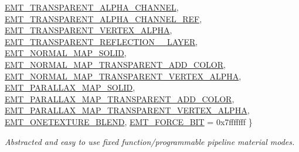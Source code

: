 \begin{DoxyCompactItemize}
\hyperlink{namespaceirr_1_1video_ac8e9b6c66f7cebabd1a6d30cbc5430f1a9b136a4137789140813682f306847ecd}{E\+M\+T\+\_\+\+T\+R\+A\+N\+S\+P\+A\+R\+E\+N\+T\+\_\+\+A\+L\+P\+H\+A\+\_\+\+C\+H\+A\+N\+N\+EL}, 
\hyperlink{namespaceirr_1_1video_ac8e9b6c66f7cebabd1a6d30cbc5430f1a2cbc6ccd7b5a5438e69327663e57555f}{E\+M\+T\+\_\+\+T\+R\+A\+N\+S\+P\+A\+R\+E\+N\+T\+\_\+\+A\+L\+P\+H\+A\+\_\+\+C\+H\+A\+N\+N\+E\+L\+\_\+\+R\+EF}, 
\newline
\hyperlink{namespaceirr_1_1video_ac8e9b6c66f7cebabd1a6d30cbc5430f1aa5139511eb2dbc1d2ae3dd91fc13f842}{E\+M\+T\+\_\+\+T\+R\+A\+N\+S\+P\+A\+R\+E\+N\+T\+\_\+\+V\+E\+R\+T\+E\+X\+\_\+\+A\+L\+P\+HA}, 
\hyperlink{namespaceirr_1_1video_ac8e9b6c66f7cebabd1a6d30cbc5430f1a7d0845dfc024777ddd5f4d8120e7e57a}{E\+M\+T\+\_\+\+T\+R\+A\+N\+S\+P\+A\+R\+E\+N\+T\+\_\+\+R\+E\+F\+L\+E\+C\+T\+I\+O\+N\+\_\+\_\+\+L\+A\+Y\+ER}, 
\hyperlink{namespaceirr_1_1video_ac8e9b6c66f7cebabd1a6d30cbc5430f1a6db87c5d5200c00419052ee6d80fb4ca}{E\+M\+T\+\_\+\+N\+O\+R\+M\+A\+L\+\_\+\+M\+A\+P\+\_\+\+S\+O\+L\+ID}, 
\hyperlink{namespaceirr_1_1video_ac8e9b6c66f7cebabd1a6d30cbc5430f1a78c15ca7cf73482e9af07a20f3eefd85}{E\+M\+T\+\_\+\+N\+O\+R\+M\+A\+L\+\_\+\+M\+A\+P\+\_\+\+T\+R\+A\+N\+S\+P\+A\+R\+E\+N\+T\+\_\+\+A\+D\+D\+\_\+\+C\+O\+L\+OR}, 
\newline
\hyperlink{namespaceirr_1_1video_ac8e9b6c66f7cebabd1a6d30cbc5430f1ad45c2f05adf276ed6efe4b97c2a0dd04}{E\+M\+T\+\_\+\+N\+O\+R\+M\+A\+L\+\_\+\+M\+A\+P\+\_\+\+T\+R\+A\+N\+S\+P\+A\+R\+E\+N\+T\+\_\+\+V\+E\+R\+T\+E\+X\+\_\+\+A\+L\+P\+HA}, 
\hyperlink{namespaceirr_1_1video_ac8e9b6c66f7cebabd1a6d30cbc5430f1a934021cc4ff72a7ac1a66f392b9abb82}{E\+M\+T\+\_\+\+P\+A\+R\+A\+L\+L\+A\+X\+\_\+\+M\+A\+P\+\_\+\+S\+O\+L\+ID}, 
\hyperlink{namespaceirr_1_1video_ac8e9b6c66f7cebabd1a6d30cbc5430f1a8ac35c2f2af727ea1d9e14caaf3998f9}{E\+M\+T\+\_\+\+P\+A\+R\+A\+L\+L\+A\+X\+\_\+\+M\+A\+P\+\_\+\+T\+R\+A\+N\+S\+P\+A\+R\+E\+N\+T\+\_\+\+A\+D\+D\+\_\+\+C\+O\+L\+OR}, 
\hyperlink{namespaceirr_1_1video_ac8e9b6c66f7cebabd1a6d30cbc5430f1ae6f617268ee97cc1640ac551c3529a68}{E\+M\+T\+\_\+\+P\+A\+R\+A\+L\+L\+A\+X\+\_\+\+M\+A\+P\+\_\+\+T\+R\+A\+N\+S\+P\+A\+R\+E\+N\+T\+\_\+\+V\+E\+R\+T\+E\+X\+\_\+\+A\+L\+P\+HA}, 
\newline
\hyperlink{namespaceirr_1_1video_ac8e9b6c66f7cebabd1a6d30cbc5430f1a44b2edd34551db04d3883772d3874f78}{E\+M\+T\+\_\+\+O\+N\+E\+T\+E\+X\+T\+U\+R\+E\+\_\+\+B\+L\+E\+ND}, 
\hyperlink{namespaceirr_1_1video_ac8e9b6c66f7cebabd1a6d30cbc5430f1a0c20156ccd4b16d2e0c868e7c32567d8}{E\+M\+T\+\_\+\+F\+O\+R\+C\+E\+\_\+B\+IT} = 0x7fffffff
 \}\begin{DoxyCompactList}\small\item\em Abstracted and easy to use fixed function/programmable pipeline material modes. \end{DoxyCompactList}

\end{DoxyCompactItemize}
